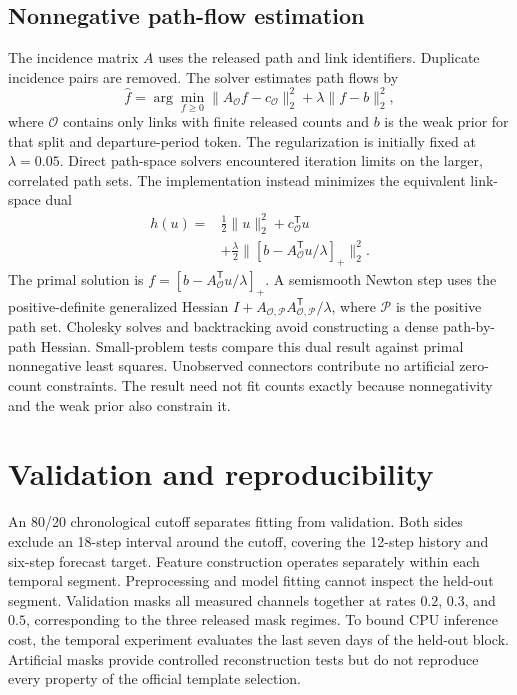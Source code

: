 \documentclass[conference]{IEEEtran}
\begin{document}
\subsection{Nonnegative path-flow estimation}
The incidence matrix $A$ uses the released path and link identifiers. Duplicate
incidence pairs are removed. The solver estimates path flows by
\begin{equation}
 \hat f=\arg\min_{f\geq0}
 \|A_{\mathcal O}f-c_{\mathcal O}\|_2^2+
 \lambda\|f-b\|_2^2,
\end{equation}
where $\mathcal O$ contains only links with finite released counts and $b$ is
the weak prior for that split and departure-period token. The regularization is initially fixed at $\lambda=0.05$. Direct path-space solvers encountered iteration limits on the larger, correlated path sets. The implementation instead minimizes the equivalent link-space dual
\begin{equation}\begin{split}
h(u)={}&\tfrac12\|u\|_2^2+c_{\mathcal O}^{\mathsf T}u\\
&+\tfrac{\lambda}{2}\|[b-A_{\mathcal O}^{\mathsf T}u/\lambda]_+\|_2^2.
\end{split}\end{equation}
The primal solution is $f=[b-A_{\mathcal O}^{\mathsf T}u/\lambda]_+$. A semismooth Newton step uses the positive-definite generalized Hessian $I+A_{\mathcal O,\mathcal P}A_{\mathcal O,\mathcal P}^{\mathsf T}/\lambda$, where $\mathcal P$ is the positive path set. Cholesky solves and backtracking avoid constructing a dense path-by-path Hessian. Small-problem tests compare this dual result against primal nonnegative least squares. Unobserved connectors contribute no artificial zero-count constraints. The result need not fit counts exactly because nonnegativity and the weak prior also constrain it.

\section{Validation and reproducibility}
An 80/20 chronological cutoff separates fitting from validation. Both sides
exclude an 18-step interval around the cutoff, covering the 12-step history
and six-step forecast target. Feature construction operates separately within
each temporal segment. Preprocessing and model fitting cannot inspect the
held-out segment. Validation masks all measured channels together at rates
$0.2$, $0.3$, and $0.5$, corresponding to the three released mask regimes.
To bound CPU inference cost, the temporal experiment evaluates the last seven days of the held-out block. Artificial masks provide controlled reconstruction tests but do not reproduce
every property of the official template selection.
\end{document}
